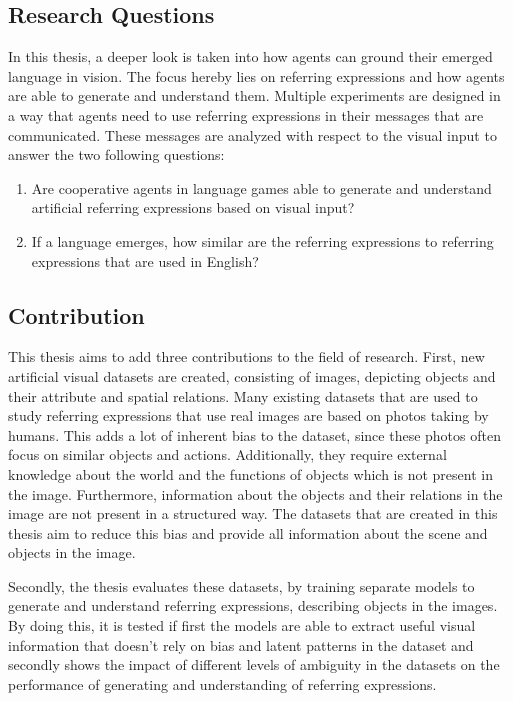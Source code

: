 \subsection{Research Questions}
In this thesis, a deeper look is taken into how agents can ground their emerged language in vision.
The focus hereby lies on referring expressions and how agents are able to generate and understand them.
Multiple experiments are designed in a way that agents need to use referring expressions in their messages that are communicated.
These messages are analyzed with respect to the visual input to answer the two following questions:
\begin{enumerate}
    \item Are cooperative agents in language games able to generate and understand artificial referring expressions based on visual input?
    \item If a language emerges, how similar are the referring expressions to referring expressions that are used in English?
\end{enumerate}


\subsection{Contribution}
This thesis aims to add three contributions to the field of research.
First, new artificial visual datasets are created, consisting of images, depicting objects and their attribute and spatial relations.
Many existing datasets that are used to study referring expressions that use real images are based on photos taking by humans.
This adds a lot of inherent bias to the dataset, since these photos often focus on similar objects and actions.
Additionally, they require external knowledge about the world and the functions of objects which is not present in the image.
Furthermore, information about the objects and their relations in the image are not present in a structured way.
The datasets that are created in this thesis aim to reduce this bias and provide all information about the scene and objects in the image.

Secondly, the thesis evaluates these datasets, by training separate models to generate and understand referring expressions, describing objects in the images.
By doing this, it is tested if first the models are able to extract useful visual information that doesn't rely on bias and latent patterns in the dataset and secondly shows the impact of different levels of ambiguity in the datasets on the performance of generating and understanding of referring expressions.

